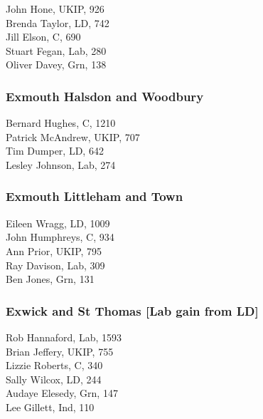 \documentclass[a4paper,openany,10pt]{book}
\begin{document}
John Hone, UKIP, 926\\
Brenda Taylor, LD, 742\\
Jill Elson, C, 690\\
Stuart Fegan, Lab, 280\\
Oliver Davey, Grn, 138\\


\subsubsection*{Exmouth Halsdon and Woodbury}



Bernard Hughes, C, 1210\\
Patrick McAndrew, UKIP, 707\\
Tim Dumper, LD, 642\\
Lesley Johnson, Lab, 274\\


\subsubsection*{Exmouth Littleham and Town}



Eileen Wragg, LD, 1009\\
John Humphreys, C, 934\\
Ann Prior, UKIP, 795\\
Ray Davison, Lab, 309\\
Ben Jones, Grn, 131\\


\subsubsection*{Exwick and St Thomas \hspace*{\fill}\nolinebreak[1]%
\enspace\hspace*{\fill}
[Lab gain from LD]}



Rob Hannaford, Lab, 1593\\
Brian Jeffery, UKIP, 755\\
Lizzie Roberts, C, 340\\
Sally Wilcox, LD, 244\\
Audaye Elesedy, Grn, 147\\
Lee Gillett, Ind, 110\\
\end{document}
